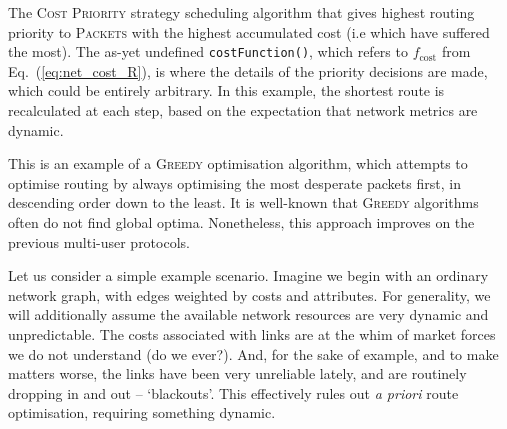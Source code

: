 \documentclass[aps,rmp,twocolumn,amsmath,amssymb,nofootinbib,superscriptaddress,longbibliography,floatfix,table-of-contents,eqsecnum]{revtex4-1}
\begin{document}
\begin{table}[!htb]
\caption{The \textsc{Cost Priority} strategy scheduling algorithm that gives highest routing priority to \textsc{Packets} with the highest accumulated cost (i.e which have suffered the most). The as-yet undefined \texttt{costFunction()}, which refers to $f_\text{cost}$ from Eq.~(\ref{eq:net_cost_R}), is where the details of the priority decisions are made, which could be entirely arbitrary. In this example, the shortest route is recalculated at each step, based on the expectation that network metrics are dynamic.} \label{alg:cost_prior_alg}
\end{table}

This is an example of a \textsc{Greedy} optimisation algorithm, which attempts to optimise routing by always optimising the most desperate packets first, in descending order down to the least. It is well-known that \textsc{Greedy} algorithms often do not find global optima. Nonetheless, this approach improves on the previous multi-user protocols.

Let us consider a simple example scenario. Imagine we begin with an ordinary network graph, with edges weighted by costs and attributes. For generality, we will additionally assume the available network resources are very dynamic and unpredictable. The costs associated with links are at the whim of market forces we do not understand (do we ever?). And, for the sake of example, and to make matters worse, the links have been very unreliable lately, and are routinely dropping in and out -- `blackouts'. This effectively rules out \textit{a priori} route optimisation, requiring something dynamic.
\end{document}
